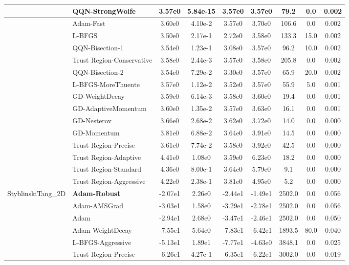 \documentclass[10pt]{article}
\begin{document}
\begin{longtable}{|l|l|c|c|c|c|c|c|c|}
\hline
 & QQN-StrongWolfe & 3.57e0 & 5.84e-15 & 3.57e0 & 3.57e0 & 79.2 & 0.0 & 0.002 \\
\hline
 & Adam-Fast & 3.60e0 & 4.10e-2 & 3.57e0 & 3.70e0 & 106.6 & 0.0 & 0.002 \\
\hline
 & L-BFGS & 3.50e0 & 2.17e-1 & 2.72e0 & 3.58e0 & 133.3 & 15.0 & 0.002 \\
\hline
 & QQN-Bisection-1 & 3.54e0 & 1.23e-1 & 3.08e0 & 3.57e0 & 96.2 & 10.0 & 0.002 \\
\hline
 & Trust Region-Conservative & 3.58e0 & 2.44e-3 & 3.57e0 & 3.58e0 & 205.8 & 0.0 & 0.002 \\
\hline
 & QQN-Bisection-2 & 3.54e0 & 7.29e-2 & 3.30e0 & 3.57e0 & 65.9 & 20.0 & 0.002 \\
\hline
 & L-BFGS-MoreThuente & 3.57e0 & 1.12e-2 & 3.52e0 & 3.57e0 & 55.9 & 5.0 & 0.001 \\
\hline
 & GD-WeightDecay & 3.59e0 & 6.14e-3 & 3.58e0 & 3.60e0 & 19.4 & 0.0 & 0.001 \\
\hline
 & GD-AdaptiveMomentum & 3.60e0 & 1.35e-2 & 3.57e0 & 3.63e0 & 16.1 & 0.0 & 0.001 \\
\hline
 & GD-Nesterov & 3.66e0 & 2.68e-2 & 3.62e0 & 3.72e0 & 14.0 & 0.0 & 0.000 \\
\hline
 & GD-Momentum & 3.81e0 & 6.88e-2 & 3.64e0 & 3.91e0 & 14.5 & 0.0 & 0.000 \\
\hline
 & Trust Region-Precise & 3.61e0 & 7.74e-2 & 3.58e0 & 3.92e0 & 42.5 & 0.0 & 0.000 \\
\hline
 & Trust Region-Adaptive & 4.41e0 & 1.08e0 & 3.59e0 & 6.23e0 & 18.2 & 0.0 & 0.000 \\
\hline
 & Trust Region-Standard & 4.36e0 & 8.00e-1 & 3.64e0 & 5.79e0 & 9.1 & 0.0 & 0.000 \\
\hline
 & Trust Region-Aggressive & 4.22e0 & 2.38e-1 & 3.81e0 & 4.95e0 & 5.2 & 0.0 & 0.000 \\
StyblinskiTang\_2D & \textbf{Adam-Robust} & -2.07e1 & 2.26e0 & -2.44e1 & -1.49e1 & 2502.0 & 0.0 & 0.056 \\
\hline
 & Adam-AMSGrad & -3.03e1 & 1.58e0 & -3.29e1 & -2.78e1 & 2502.0 & 0.0 & 0.056 \\
\hline
 & Adam & -2.94e1 & 2.68e0 & -3.47e1 & -2.46e1 & 2502.0 & 0.0 & 0.050 \\
\hline
 & Adam-WeightDecay & -7.55e1 & 5.64e0 & -7.83e1 & -6.42e1 & 1893.5 & 80.0 & 0.040 \\
\hline
 & L-BFGS-Aggressive & -5.13e1 & 1.89e1 & -7.77e1 & -4.63e0 & 3848.1 & 0.0 & 0.025 \\
\hline
 & Trust Region-Precise & -6.26e1 & 4.27e-1 & -6.35e1 & -6.22e1 & 3002.0 & 0.0 & 0.019 \\

\end{longtable}
\end{document}
